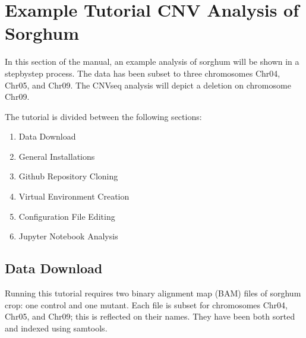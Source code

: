 \documentclass[letterpaper,10pt,english]{sphinxhowto}
\begin{document}
\begin{sphinxVerbatim}[commandchars=\\\{\}]
 \PYG{p}{[} \PYG{p}{]}   
\end{sphinxVerbatim}


\section{Example Tutorial \sphinxhyphen{} CNV Analysis of Sorghum}
\label{\detokenize{index:example-tutorial-cnv-analysis-of-sorghum}}
\sphinxAtStartPar
In this section of the manual, an example analysis of sorghum will be shown in a step\sphinxhyphen{}by\sphinxhyphen{}step process. The data has been subset to three chromosomes Chr04, Chr05, and Chr09. The CNVseq analysis will depict a deletion on chromosome Chr09.

\sphinxAtStartPar
The tutorial is divided between the following sections:
\begin{enumerate}
%
\item {} 
\sphinxAtStartPar
Data Download

\item {} 
\sphinxAtStartPar
General Installations

\item {} 
\sphinxAtStartPar
Github Repository Cloning

\item {} 
\sphinxAtStartPar
Virtual Environment Creation

\item {} 
\sphinxAtStartPar
Configuration File Editing

\item {} 
\sphinxAtStartPar
Jupyter Notebook Analysis

\end{enumerate}


\subsection{Data Download}
\label{\detokenize{index:data-download}}
\sphinxAtStartPar
Running this tutorial requires two binary alignment map (BAM) files of sorghum crop: one control and one mutant. Each  file is subset for chromosomes Chr04, Chr05, and Chr09; this is reflected on their names. They have been both sorted and indexed using samtools.
\end{document}
